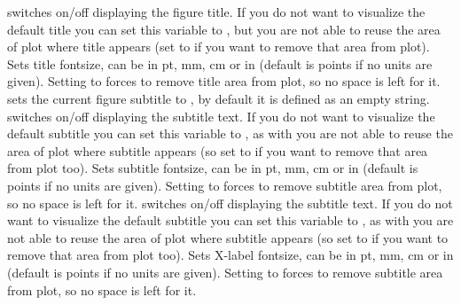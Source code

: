    {  switches on/off displaying the figure title. If you do not want to visualize the default title you can set this variable to , but you are not able to reuse the area of plot where title appears (set  to  if you want to remove that area from plot). }
%
   { {\tbdef} }
%
   { Sets title fontsize,  can be in pt, mm, cm or in (default is points if no units are given). Setting  to  forces {\prog} to remove title area from plot, so no space is left for it. }
%
   {  sets the current figure subtitle to , by default it is defined as an empty string. }
%
   {  switches on/off displaying the subtitle text. If you do not want to visualize the default subtitle you can set this variable to , as with  you are not able to reuse the area of plot where subtitle appears (so set  to  if you want to remove that area from plot too). }
%
   { {\tbdef} }
%
   { Sets subtitle fontsize,  can be in pt, mm, cm or in (default is points if no units are given). Setting  to  forces {\prog} to remove subtitle area from plot, so no space is left for it. }
%
   { {\tbdef} }
%
   {  switches on/off displaying the subtitle text. If you do not want to visualize the default subtitle you can set this variable to , as with  you are not able to reuse the area of plot where subtitle appears (so set  to  if you want to remove that area from plot too). }
%
   { {\tbdef} }
%
   { Sets X-label fontsize,  can be in pt, mm, cm or in (default is points if no units are given). Setting  to  forces {\prog} to remove subtitle area from plot, so no space is left for it. }
%
